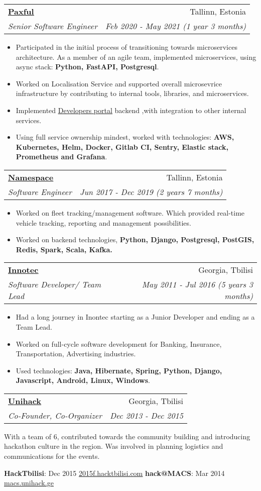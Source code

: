 \documentclass[letterpaper,11pt]{article}
\makeatletter
\newcommand{\resumeItem}[1]{
  \item\small{
    #1 \vspace{-2pt}
  }
}
\newcommand{\resumeSubheading}[4]{
  \vspace{-1pt}\item
    \begin{tabular*}{0.97\textwidth}{l@{\extracolsep{\fill}}r}
      \textbf{#1} & #2 \\
      \textit{\small#3} & \textit{\small #4} \\
    \end{tabular*}\vspace{-5pt}
}
\newcommand{\resumeItemListStart}{\begin{itemize}}
\newcommand{\resumeItemListEnd}{\end{itemize}\vspace{-5pt}}
\newcommand{\link}[2]{\href{#1}{\underline{#2}}}
\makeatother
\begin{document}
\resumeSubheading
      {\link{https://paxful.com}{Paxful}}{Tallinn, Estonia}
      {Senior Software Engineer}{Feb 2020 - May 2021 (1 year 3 months)}
      \resumeItemListStart
	   \resumeItem{Participated in the initial process of transitioning towards microservices architecture. As a member of an agile team, implemented microservices, using async stack: \textbf{Python, FastAPI, Postgresql}.}
        \resumeItem{Worked on Localisation Service and supported overall microsevrice infrastructure by contributing to internal tools, libraries, and microservices.}
        \resumeItem{Implemented \link{https://developers.paxful.com/}{Developers portal} backend ,with integration to other internal services.}
        \resumeItem{Using full service ownership mindest, worked with technologies: \textbf{AWS, Kubernetes, Helm, Docker, Gitlab CI, Sentry, Elastic stack, Prometheus and Grafana}.}
      \resumeItemListEnd
	
    \resumeSubheading
      {\link{https://namespace.ee}{Namespace}}{Tallinn, Estonia}
      {Software Engineer}{Jun 2017 - Dec 2019 (2 years 7 months)}
      \resumeItemListStart
        \resumeItem{Worked on fleet tracking/management software. Which provided real-time vehicle tracking, reporting and management possibilities.}
		\resumeItem{Worked on backend technologies, \textbf{Python, Django, Postgresql, PostGIS, Redis, Spark, Scala, Kafka.}}
      \resumeItemListEnd

    \resumeSubheading
      {\href{http://innotec.ge/}{\underline{Innotec}}}{Georgia, Tbilisi}
      {Software Developer/ Team Lead}{May 2011 - Jul 2016 (5 years 3 months)}
      \resumeItemListStart
        \resumeItem{Had a long journey in Inontec starting as a Junior Developer and ending as a Team Lead.}
        \resumeItem{Worked on full-cycle software development for Banking, Insurance, Transportation, Advertising industries.}
        \resumeItem{Used technologies: \textbf{Java, Hibernate, Spring, Python, Django, Javascript, Android, Linux, Windows}.}
      \resumeItemListEnd
      
     \resumeSubheading
      {\href{https://www.facebook.com/unihackge/}{\underline{Unihack}}}{Georgia, Tbilisi}
      {Co-Founder, Co-Organizer}{Dec 2013 - Dec 2015}

		With a team of 6, contributed towards the community building and introducing hackathon culture in the region. Was involved in planning logistics and communications for the events.

     \textbf{HackTbilisi}{: Dec 2015 \link{https://www.facebook.com/events/684989148311419/}{2015f.hacktbilisi.com}}
     \hfill
     \textbf{hack@MACS}{: Mar 2014 \link{https://www.facebook.com/events/449121528548787/}{macs.unihack.ge}}
     
\end{document}
